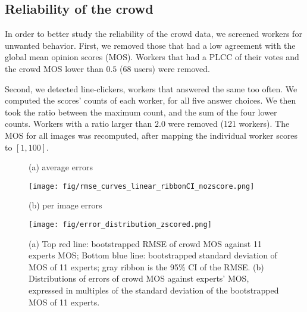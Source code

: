 \documentclass{article}
\begin{document}
\subsection{Reliability of the crowd}

In order to better study the reliability of the crowd data, we screened workers for unwanted behavior. First, we removed those that had a low agreement with the global mean opinion scores (MOS). Workers that had a PLCC of their votes and the crowd MOS lower than $0.5$ (68 users) were removed.

Second, we detected line-clickers, workers that answered the same too often. We computed the scores' counts of each worker, for all five answer choices. We then took the ratio between the maximum count, and the sum of the four lower counts. Workers with a ratio larger than $2.0$ were removed (121 workers). The MOS for all images was recomputed, after mapping the individual worker scores to $[1,100]$.

\begin{figure}[!htb]
\vspace{-5pt}
\centering
\begin{minipage}{.47\linewidth}
\centerline{(a) average errors}
\centerline{\texttt{[image: fig/rmse\_curves\_linear\_ribbonCI\_nozscore.png]}}
\end{minipage}\begin{minipage}{.47\linewidth}
\centerline{(b) per image errors}
\centerline{\texttt{[image: fig/error\_distribution\_zscored.png]}}
\end{minipage}

\caption{(a) Top red line: bootstrapped RMSE of crowd  MOS against 11 experts MOS; Bottom blue line: bootstrapped standard deviation of MOS of 11 experts; gray ribbon is the 95\% CI of the RMSE. (b) Distributions of errors of crowd MOS against experts' MOS, expressed in multiples of the standard deviation of the bootstrapped MOS of 11 experts.}
\label{fig:rmse_curves}
\vspace{-9pt}
\end{figure}


\begin{table}[!htb]
\vspace{-15pt}
\caption{Performance of IQA methods.}
\label{tb:iqacomp}
\centering
{}
\end{table}
\end{document}
